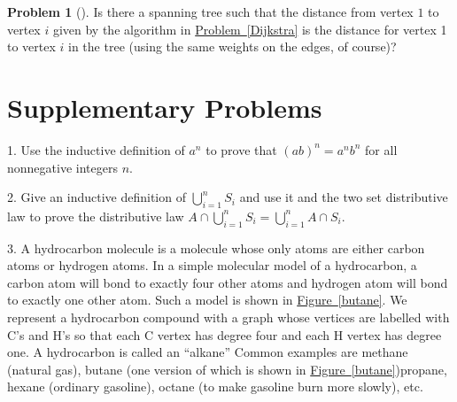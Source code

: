 \documentclass[10pt,]{book}
\theoremstyle{plain}
\theoremstyle{definition}
\newtheorem{activity}[project]{Problem}
\theoremstyle{definition}
\numberwithin{equation}{chapter}
\newcommand{\importantarrow}{\Rightarrow}
\begin{document}
\begin{activity}[]\marginsymbol[-1em]{} \label{activity-121}
Is there a spanning tree such that the distance from vertex \(1\) to vertex \(i\) given by the algorithm in \hyperref[Dijkstra]{Problem~\ref{Dijkstra}} is the distance for vertex 1 to vertex \(i\) in the tree (using the same weights on the edges, of course)?%
\end{activity}
\typeout{************************************************}
\typeout{************************************************}
\section[{Supplementary Problems}]{Supplementary Problems}\label{sec_induction-suppprobs}
\begin{exerciselist}
\item[1.]\marginsymbol[-1em]{} \hypertarget{exercise-13}{}Use the inductive definition of \(a^n\) to prove that \((ab)^n=a^nb^n\) for all nonnegative integers \(n\).%
\par\smallskip
\item[2.]\marginsymbol[-1em]{} \hypertarget{exercise-14}{}Give an inductive definition of \(\displaystyle \bigcup_{i=1}^nS_i\) and use it and the two set distributive law to prove the distributive law \(\displaystyle{A\cap \bigcup_{i=1}^n S_i=\bigcup_{i=1}^n A\cap S_i}\).%
\par\smallskip
\item[3.]\marginsymbol[-1em]{\pdftooltip{$\importantarrow$}{especially interesting}} \hypertarget{exercise-15}{}A hydrocarbon molecule is a molecule whose only atoms are either carbon atoms or hydrogen atoms.  In a simple molecular model of a hydrocarbon, a carbon atom will bond to exactly four other atoms and hydrogen atom will bond to exactly one other atom. Such a model is shown in \hyperref[butane]{Figure~\ref{butane}}. We represent a hydrocarbon compound with a graph whose vertices are labelled with C's and H's so that each C vertex has degree four and each H vertex has degree one.  A hydrocarbon is called an ``alkane'' Common examples are methane (natural gas), butane (one version of which is shown in \hyperref[butane]{Figure~\ref{butane}})propane, hexane (ordinary gasoline), octane (to make gasoline burn more slowly), etc.%
\begin{figure}
\centering
{
}
\end{figure}
\end{exerciselist}
\end{document}
